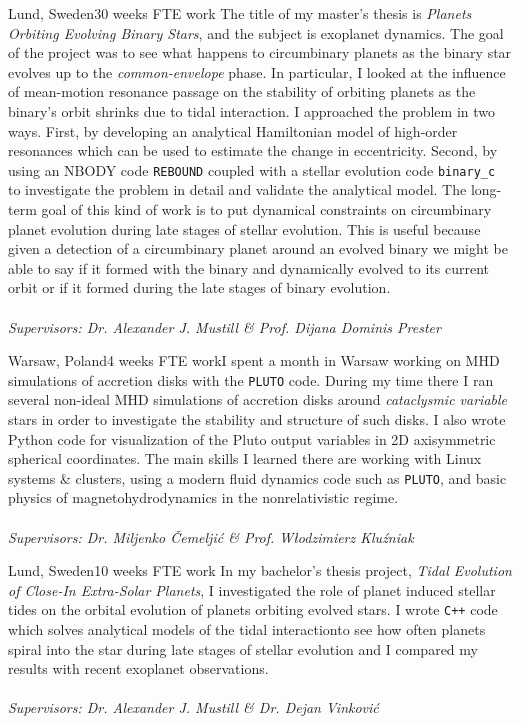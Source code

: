 \documentclass[11pt,a4paper,roman]{moderncv}
\begin{document}
{Lund, Sweden}{30 weeks FTE work}{
The title of my master's thesis
is \emph{Planets Orbiting Evolving Binary Stars}, and the subject is exoplanet dynamics. 
The goal of the 
project was to see what happens to circumbinary planets as the binary star evolves
up to the \emph{common-envelope} phase. In particular, I looked at the
influence of mean-motion resonance passage on the stability of orbiting planets
as the binary's orbit shrinks due to tidal interaction. I approached the
problem in two ways. First, by developing an analytical Hamiltonian model 
of high-order resonances which can be used to estimate the change in eccentricity. 
Second, by using an NBODY code \texttt{REBOUND} coupled with a 
stellar evolution code \texttt{binary\_c}
to investigate the problem in detail and validate the analytical model.
The long-term goal of this kind of work is to put dynamical constraints on circumbinary
planet evolution during late stages of stellar evolution. This is useful because
given a detection of a circumbinary planet around an evolved binary we might
be able to say if it formed with the binary and dynamically evolved to its current
orbit or if it formed during the late stages of binary evolution.\\\\
\emph{Supervisors: Dr. Alexander J. Mustill \& Prof. Dijana Dominis Prester}}

{Warsaw, Poland}{4 weeks FTE work}{I spent a month in Warsaw working on MHD simulations of 
accretion disks with the \texttt{PLUTO} code. During my time there I ran several 
non-ideal MHD simulations of accretion disks around \emph{cataclysmic variable} 
stars in order to investigate the stability and
structure of such disks. I also wrote Python code for visualization of the Pluto 
output variables in 2D axisymmetric spherical coordinates. 
The main skills I learned there are working with Linux systems 
\& clusters, using a modern 
fluid dynamics code such as \texttt{PLUTO}, and basic 
physics of magnetohydrodynamics in the nonrelativistic regime.\\\\
\emph{Supervisors: Dr. Miljenko \v Cemelji\'c \& Prof. W\l odzimierz Klu\'zniak}
}

{Lund, Sweden}{10 weeks FTE work}{
In my bachelor's thesis project, 
\textit{Tidal Evolution of Close-In Extra-Solar Planets}, I investigated the role
of planet induced stellar tides on the orbital evolution of planets orbiting
evolved stars. I wrote \texttt{C++} code which solves analytical models of
the tidal interactionto see how often planets spiral into
the star during late stages of stellar evolution and I compared my results 
with recent exoplanet observations. \\\\
\emph{Supervisors: Dr. Alexander J. Mustill \& Dr. Dejan Vinkovi\'{c}}
}
\end{document}
